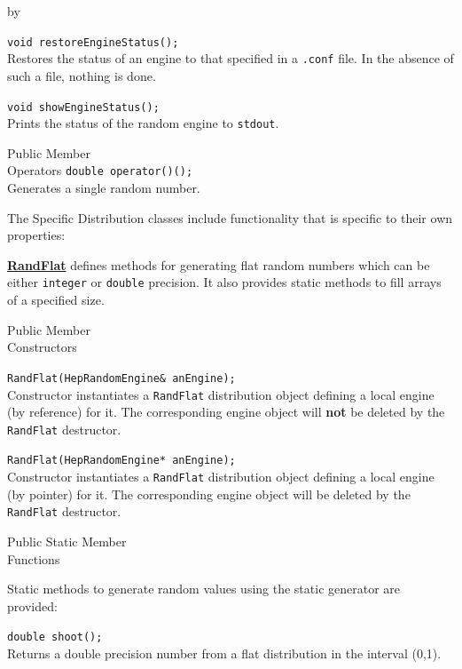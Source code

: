 \documentclass[twoside]{article}
\newcommand{\comp}[1]{\texttt{#1}}%
\newcommand{\entrylabel}[1]{\mbox{\textbf{{#1}}}\hfil}%
\newenvironment{entry}
{\begin{list}{}%
    {\renewcommand{\makelabel}{\entrylabel}%
     \setlength{\labelwidth}{90pt}%
     \setlength{\leftmargin}{\labelwidth}
     \advance\leftmargin by \labelsep%
      }%
    }%
  {\end{list}}
\newcommand{\Entrylabel}[1]%
{\raisebox{0pt}[1ex][0pt]{\makebox[\labelwidth][l]%
    {\parbox[t]{\labelwidth}{\hspace{0pt}\textbf{{#1}}}}}}
\newenvironment{Entry}%
{\renewcommand{\entrylabel}{\Entrylabel}\begin{entry}}%
  {\end{entry}}
\begin{document}
\begin{description}
\begin{Entry}
    \verb+void restoreEngineStatus();+\\
    Restores the status of an engine to that specified in
    a \comp{.conf} file.  In the absence of such a file,
    nothing is done.

    \verb+void showEngineStatus();+\\
    Prints the status of the random engine to \comp{stdout}.
        
\item[Public Member\\ Operators]
    \verb+double operator()();+\\
    Generates a single random number.
  
    The Specific Distribution classes include functionality that is specific
    to their own properties:
    
    \begin{description}
      \item \underline{\bf RandFlat}  defines methods for generating flat random numbers
        which can be either \comp{integer} or \comp{double} precision.
        It also provides static methods to fill arrays of a specified size.
    \end{description}
    
\item[Public Member\\ Constructors]
  
    \verb+RandFlat(HepRandomEngine& anEngine);+\\
    Constructor instantiates a \comp{RandFlat} distribution
    object defining a local engine (by reference) for it.  The
    corresponding engine object will {\bf not} be deleted by the
    \comp{RandFlat} destructor.
     
    \verb+RandFlat(HepRandomEngine* anEngine);+\\
    Constructor instantiates a \comp{RandFlat} distribution
    object defining a local engine (by pointer) for it.
    The corresponding engine object will be deleted by the
    \comp{RandFlat} destructor.

\item[Public Static Member\\ Functions]
  
    Static methods to generate random values using the static generator
    are provided:

    \verb+double shoot();+\\
    Returns a double precision number from a flat distribution
    in the interval (0,1).
    

\end{Entry}
\end{description}
\end{document}
